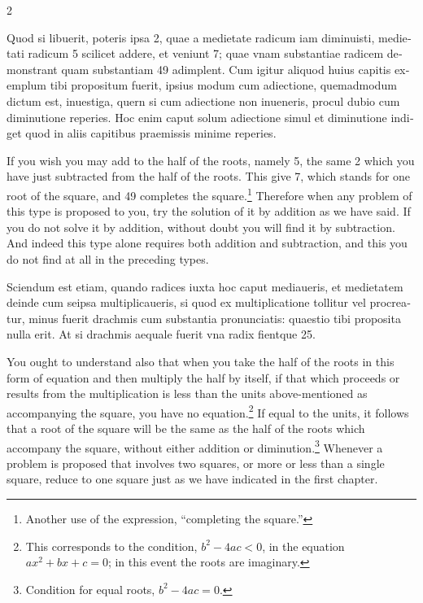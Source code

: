 \documentclass[11pt,a4paper,twoside]{book}
\newcommand{\latincolumn}[1]{\textlatin{\small #1}}
\begin{document}
\begin{paracol}{2}
\switchcolumn*

\latincolumn{Quod si libuerit, poteris ipsa 2, quae a medietate radicum iam diminuisti, medietati radicum 5 scilicet addere, et veniunt 7; quae vnam substantiae radicem demonstrant quam substantiam 49 adimplent. Cum igitur aliquod huius capitis exemplum tibi propositum fuerit, ipsius modum cum adiectione, quemadmodum dictum est, inuestiga, quern si cum adiectione non inueneris, procul dubio cum diminutione reperies. Hoc enim caput solum adiectione simul et diminutione indiget quod in aliis capitibus praemissis minime reperies.}

\switchcolumn

If you wish you may add to the half of the roots, namely 5, the same 2 which you have just subtracted from the half of the roots. This give 7, which stands for one root of the square, and 49 completes the square.\footnote{Another use of the expression, ``completing the square.''} Therefore when any problem of this type is proposed to you, try the solution of it by addition as we have said. If you do not solve it by addition, without doubt you will find it by subtraction. And indeed this type alone requires both addition and subtraction, and this you do not find at all in the preceding types.

\switchcolumn*

\latincolumn{Sciendum est etiam, quando radices iuxta hoc caput mediaueris, et medietatem deinde cum seipsa multiplicaueris, si quod ex multiplicatione tollitur vel procreatur, minus fuerit drachmis cum substantia pronunciatis: quaestio tibi proposita nulla erit. At si drachmis aequale fuerit vna radix fientque 25.}

\switchcolumn

You ought to understand also that when you take the half of the roots in this form of equation and then multiply the half by itself, if that which proceeds or results from the multiplication is less than the units above-mentioned as accompanying the square, you have no equation.\footnote{This corresponds to the condition, $b^2 - 4ac < 0$, in the equation $ax^2 + bx + c = 0$; in this event the roots are imaginary.} If equal to the units, it follows that a root of the square will be the same as the half of the roots which accompany the square, without either addition or diminution.\footnote{Condition for equal roots, $b^2 - 4ac = 0$.} Whenever a problem is proposed that involves two squares, or more or less than a single square, reduce to one square just as we have indicated in the first chapter.


\end{paracol}
\end{document}
